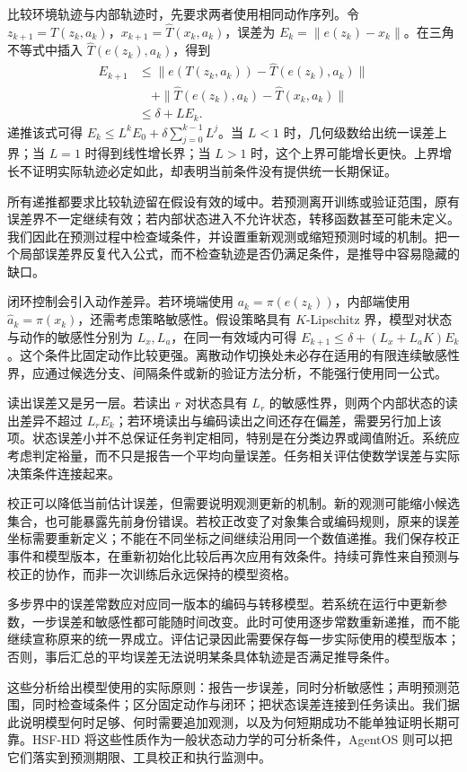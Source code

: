 比较环境轨迹与内部轨迹时，先要求两者使用相同动作序列。令 $z_{k+1}=T(z_k,a_k)$，$x_{k+1}=\widehat T(x_k,a_k)$，误差为 $E_k=\|e(z_k)-x_k\|$。在三角不等式中插入 $\widehat T(e(z_k),a_k)$，得到
\begin{align}
E_{k+1}&\leq\|e(T(z_k,a_k))-\widehat T(e(z_k),a_k)\|\\
&\quad+\|\widehat T(e(z_k),a_k)-\widehat T(x_k,a_k)\|\\
&\leq\delta+L E_k.
\end{align}
递推该式可得 $E_k\leq L^k E_0+\delta\sum_{j=0}^{k-1}L^j$。当 $L<1$ 时，几何级数给出统一误差上界；当 $L=1$ 时得到线性增长界；当 $L>1$ 时，这个上界可能增长更快。上界增长不证明实际轨迹必定如此，却表明当前条件没有提供统一长期保证。

所有递推都要求比较轨迹留在假设有效的域中。若预测离开训练或验证范围，原有误差界不一定继续有效；若内部状态进入不允许状态，转移函数甚至可能未定义。我们因此在预测过程中检查域条件，并设置重新观测或缩短预测时域的机制。把一个局部误差界反复代入公式，而不检查轨迹是否仍满足条件，是推导中容易隐藏的缺口。

闭环控制会引入动作差异。若环境端使用 $a_k=\pi(e(z_k))$，内部端使用 $\widehat a_k=\pi(x_k)$，还需考虑策略敏感性。假设策略具有 $K$-Lipschitz 界，模型对状态与动作的敏感性分别为 $L_x,L_a$，在同一有效域内可得 $E_{k+1}\leq\delta+(L_x+L_a K)E_k$。这个条件比固定动作比较更强。离散动作切换处未必存在适用的有限连续敏感性界，应通过候选分支、间隔条件或新的验证方法分析，不能强行使用同一公式。

读出误差又是另一层。若读出 $r$ 对状态具有 $L_r$ 的敏感性界，则两个内部状态的读出差异不超过 $L_r E_k$；若环境读出与编码读出之间还存在偏差，需要另行加上该项。状态误差小并不总保证任务判定相同，特别是在分类边界或阈值附近。系统应考虑判定裕量，而不只是报告一个平均向量误差。任务相关评估使数学误差与实际决策条件连接起来。

校正可以降低当前估计误差，但需要说明观测更新的机制。新的观测可能缩小候选集合，也可能暴露先前身份错误。若校正改变了对象集合或编码规则，原来的误差坐标需要重新定义；不能在不同坐标之间继续沿用同一个数值递推。我们保存校正事件和模型版本，在重新初始化比较后再次应用有效条件。持续可靠性来自预测与校正的协作，而非一次训练后永远保持的模型资格。

多步界中的误差常数应对应同一版本的编码与转移模型。若系统在运行中更新参数，一步误差和敏感性都可能随时间改变。此时可使用逐步常数重新递推，而不能继续宣称原来的统一界成立。评估记录因此需要保存每一步实际使用的模型版本；否则，事后汇总的平均误差无法说明某条具体轨迹是否满足推导条件。

这些分析给出模型使用的实际原则：报告一步误差，同时分析敏感性；声明预测范围，同时检查域条件；区分固定动作与闭环；把状态误差连接到任务读出。我们据此说明模型何时足够、何时需要追加观测，以及为何短期成功不能单独证明长期可靠。HSF-HD 将这些性质作为一般状态动力学的可分析条件，AgentOS 则可以把它们落实到预测期限、工具校正和执行监测中。

